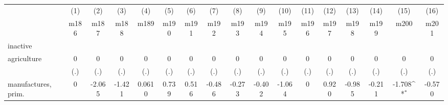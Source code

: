 {
\def\sym#1{\ifmmode^{#1}\else\(^{#1}\)\fi}
\begin{tabular}{l*{16}{c}}
\hline\hline
                    &\multicolumn{1}{c}{(1)}&\multicolumn{1}{c}{(2)}&\multicolumn{1}{c}{(3)}&\multicolumn{1}{c}{(4)}&\multicolumn{1}{c}{(5)}&\multicolumn{1}{c}{(6)}&\multicolumn{1}{c}{(7)}&\multicolumn{1}{c}{(8)}&\multicolumn{1}{c}{(9)}&\multicolumn{1}{c}{(10)}&\multicolumn{1}{c}{(11)}&\multicolumn{1}{c}{(12)}&\multicolumn{1}{c}{(13)}&\multicolumn{1}{c}{(14)}&\multicolumn{1}{c}{(15)}&\multicolumn{1}{c}{(16)}\\
                    &\multicolumn{1}{c}{m186}&\multicolumn{1}{c}{m187}&\multicolumn{1}{c}{m188}&\multicolumn{1}{c}{m189}&\multicolumn{1}{c}{m190}&\multicolumn{1}{c}{m191}&\multicolumn{1}{c}{m192}&\multicolumn{1}{c}{m193}&\multicolumn{1}{c}{m194}&\multicolumn{1}{c}{m195}&\multicolumn{1}{c}{m196}&\multicolumn{1}{c}{m197}&\multicolumn{1}{c}{m198}&\multicolumn{1}{c}{m199}&\multicolumn{1}{c}{m200}&\multicolumn{1}{c}{m201}\\
\hline
inactive            &                     &                     &                     &                     &                     &                     &                     &                     &                     &                     &                     &                     &                     &                     &                     &                     \\
agriculture         &           0         &           0         &           0         &           0         &           0         &           0         &           0         &           0         &           0         &           0         &           0         &           0         &           0         &           0         &           0         &           0         \\
                    &         (.)         &         (.)         &         (.)         &         (.)         &         (.)         &         (.)         &         (.)         &         (.)         &         (.)         &         (.)         &         (.)         &         (.)         &         (.)         &         (.)         &         (.)         &         (.)         \\
[1em]
manufactures, prim. &           0         &      -2.065         &      -1.421         &      0.0610         &       0.739         &       0.516         &      -0.486         &      -0.273         &      -0.402         &      -1.064         &           0         &       0.920         &      -0.985         &      -0.211         &      -1.708\sym{*}  &      -0.570         \\

\end{tabular}}
